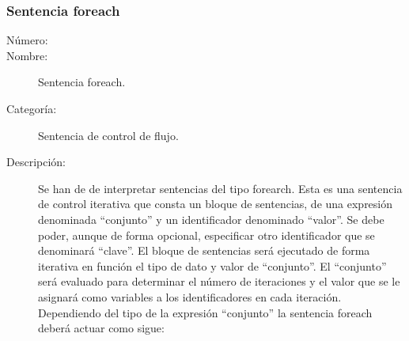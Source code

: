 \subsubsection{Sentencia foreach}
\begin{framed}
	\begin{description}
		\item [Número:] \cn
		\item [Nombre:] Sentencia foreach.
		\item [Categoría:] Sentencia de control de flujo.
		\item [Descripción:] Se han de de interpretar sentencias del tipo forearch. Esta es una sentencia de control
		iterativa que consta un bloque de sentencias, de una expresión denominada ``conjunto'' y  un identificador denominado ``valor''.
		Se debe poder, aunque de forma opcional, especificar otro identificador que se denominará ``clave''.
		El bloque de sentencias será ejecutado de forma iterativa en función el tipo de dato y valor de ``conjunto''.  El ``conjunto''
		será evaluado para determinar el número de iteraciones y el valor que se le asignará como variables a los identificadores en
		cada iteración. Dependiendo del tipo de la expresión ``conjunto'' la sentencia foreach deberá actuar como sigue:
		

\end{description}
\end{framed}
